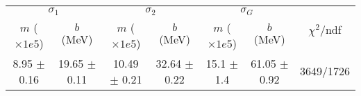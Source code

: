 \begin{tabular}{cc|cc|cc||c}
\multicolumn{2}{c|}{$\sigma_1$} & \multicolumn{2}{|c}{$\sigma_2$} & \multicolumn{2}{|c}{$\sigma_G$}  & \multirow{2}{*}{$\chi^2/$ndf}\\
$m$ ($\times1e5$) & $b$ (MeV) & $m$ ($\times1e5$) & $b$ (MeV) & $m$ ($\times1e5$) & $b$ (MeV) & \\
\hline
8.95 $\pm$ 0.16 & 19.65 $\pm$ 0.11 & 10.49 $\pm$ 0.21 & 32.64 $\pm$ 0.22 & 15.1 $\pm$ 1.4 & 61.05 $\pm$ 0.92 & 3649/1726\\
\end{tabular}
